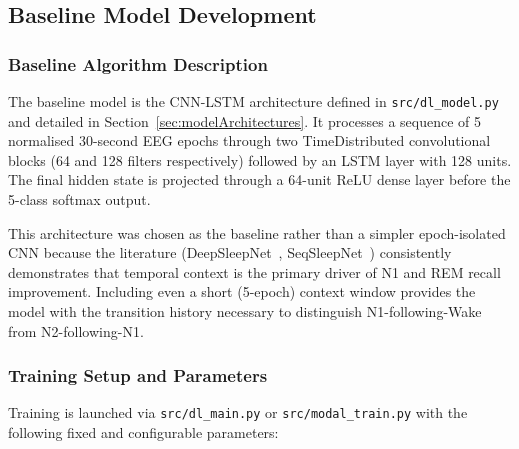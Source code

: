 \documentclass[10pt]{article}
\begin{document}
\subsection{Baseline Model Development}
\label{sec:baselineModelDevelopment}

\subsubsection{Baseline Algorithm Description}
\label{sec:baselineAlgorithm}

The baseline model is the CNN-LSTM architecture defined in \texttt{src/dl\_model.py} and detailed in Section~\ref{sec:modelArchitectures}. It processes a sequence of 5 normalised 30-second EEG epochs through two TimeDistributed convolutional blocks (64 and 128 filters respectively) followed by an LSTM layer with 128 units. The final hidden state is projected through a 64-unit ReLU dense layer before the 5-class softmax output.

This architecture was chosen as the baseline rather than a simpler epoch-isolated CNN because the literature (DeepSleepNet~\cite{supratak2017deepsleepnet}, SeqSleepNet~\cite{phan2019seqsleepnet}) consistently demonstrates that temporal context is the primary driver of N1 and REM recall improvement. Including even a short (5-epoch) context window provides the model with the transition history necessary to distinguish N1-following-Wake from N2-following-N1.

\subsubsection{Training Setup and Parameters}
\label{sec:trainingSetup}

Training is launched via \texttt{src/dl\_main.py} or \texttt{src/modal\_train.py} with the following fixed and configurable parameters:
\end{document}
